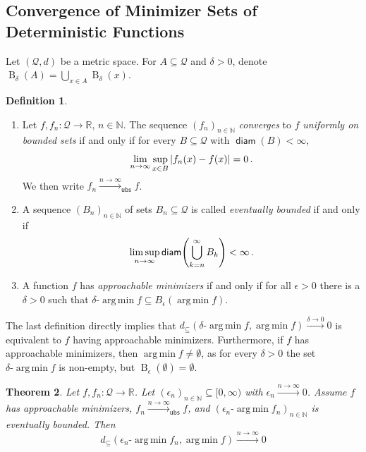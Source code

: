 \documentclass{scrartcl}
\renewcommand{\subset}{\subseteq}
\DeclareMathOperator{\diam}{\mathsf{diam}}
\DeclareMathOperator{\ball}{\mathrm{B}}
\newcommand*{\mc}[1]{\mathcal{#1}}
\newcommand{\N}{\mathbb{N}}
\newcommand{\R}{\mathbb{R}}
\newcommand{\equationFullstop}{\, .}
\newcommand{\eqfs}{\equationFullstop}
\DeclareMathOperator*{\argmin}{arg\,min}
\def\MS{\mathcal{Q}}\def\epi{\mathsf{epi}}\def\aec{\mathsf{aec}}\def\alsec{\mathsf{alsec}}\def\aecp{\mathsf{aec}_P}\def\Hausdorff{\mathsf{H}}\def\Haus{\mathsf{H}}\def\ubs{\mathsf{ubs}}\newcommand{\epiconv}[1]{\xrightarrow{#1\to\infty}_\epi}\newcommand{\hausconv}[1]{\xrightarrow{#1\to\infty}_\Hausdorff}\newcommand{\ubsconv}[1]{\xrightarrow{#1\to\infty}_\ubs}\newcommand{\ol}[2]{\overline{#1,\!#2}}
\theoremstyle{plain}\newtheorem{theorem}{Theorem}[section]
\theoremstyle{definition}
\newtheorem{definition}[theorem]{Definition}
\theoremstyle{remark}
\begin{document}
\begin{appendix}
\subsection{Convergence of Minimizer Sets of Deterministic Functions}\label{ssec:alt:det}
Let $(\mc Q, d)$ be a metric space. For $A\subset \mc Q$ and $\delta>0$, denote $\ball_\delta(A) = \bigcup_{x\in A} \ball_\delta(x)$. 
\begin{definition} \mbox{ }
	\begin{enumerate}[label=(\roman*)]
	\item 
		Let $f,f_n \colon \MS\to\R$, $n\in\N$.
		The sequence $(f_n)_{n\in\N}$  \emph{converges} to $f$ \emph{uniformly on bounded sets} if and only if for every $B\subset \MS$ with $\diam(B)<\infty$,
		\begin{equation*}
		\lim_{n\to\infty} \sup_{x\in B}\abs{f_n(x) - f(x)} =0
		\eqfs
		\end{equation*}
		We then write $f_n\ubsconv{n}f$.
	\item 
		A sequence $(B_n)_{n\in\N}$ of sets $B_n \subset \MS$ is called \emph{eventually bounded} if and only if
		\begin{equation*}
		\limsup_{n\to\infty} \diam\brOf{\bigcup_{k=n}^\infty B_k} < \infty
		\eqfs
		\end{equation*}
	\item 
		A function $f$ has \emph{approachable minimizers} if and only if for all $\epsilon >0$ there is a $\delta>0$ such that
		$\delta\text{-}\argmin f \subset B_\epsilon(\argmin f)$.
	\end{enumerate}	
\end{definition}
The last definition directly implies that $d_\subset(\delta\text{-}\argmin f, \argmin f) \xrightarrow{\delta\to0} 0$ is equivalent to $f$ having approachable minimizers. Furthermore, if $f$ has approachable minimizers, then $\argmin f \neq \emptyset$, as for every $\delta>0$ the set $\delta\text{-}\argmin f$ is non-empty, but $\ball_\epsilon(\emptyset)=\emptyset$.
\begin{theorem}\label{thm:alt:convOfMini}
	Let $f,f_n \colon \MS\to\R$. Let $(\epsilon_n)_{n\in\N}\subset [0,\infty)$ with $\epsilon_n \xrightarrow{n\to\infty}0$. 
	Assume $f$ has approachable minimizers, $f_n \xrightarrow{n\to\infty}_{\ubs} f$, and $(\epsilon_n\text{-}\argmin f_n)_{n\in\N}$ is eventually bounded.
	Then
	\begin{equation*}
		d_\subset(\epsilon_n\text{-}\argmin f_n, \argmin f)\xrightarrow{n\to\infty}
		0
	\end{equation*}

\end{theorem}
\end{appendix}
\end{document}
